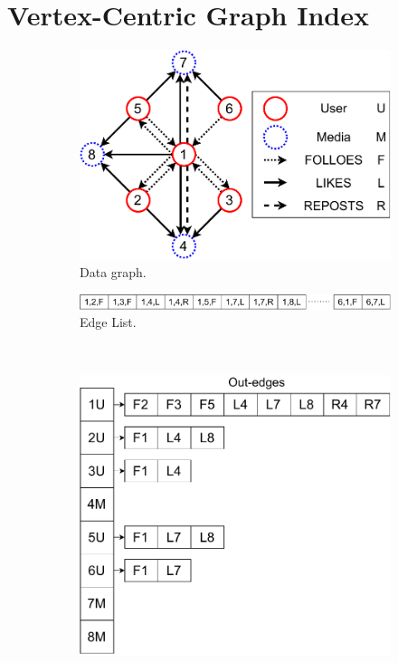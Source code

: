\section{Vertex-Centric Graph Index}\label{sec:storage}
\begin{figure}
  \centering
  \begin{subfigure}[b]{0.27\textwidth}
    \centering
    \includegraphics[scale=0.4]{img/data_graph}
    \caption{Data graph.}\label{fig:data_graph}
  \end{subfigure}
  \quad
  \begin{minipage}[b]{0.68\textwidth}
    \centering
    \begin{subfigure}[b]{\textwidth}
      \centering
      \includegraphics[scale=0.3]{img/data_edge}
      \caption{Edge List.}\label{fig:data_edge}
    \end{subfigure}
    \\
    \begin{subfigure}[b]{0.35\textwidth}
      \centering
      \includegraphics[scale=0.3]{img/data_row}

\end{subfigure}
\end{minipage}
\end{figure}
